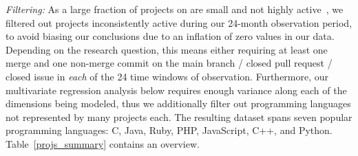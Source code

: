 \smallskip\noindent\emph{Filtering:}
As a large fraction of projects on \GH are small and not highly 
active~\cite{gousios2014exploratory}, we filtered out projects inconsistently 
active during our 24-month observation period, to avoid biasing our 
conclusions due to an inflation of zero values in our data.
Depending on the research question, this means either requiring at least 
one merge and one non-merge commit on the main branch / closed pull
request / closed issue in \emph{each} of the 24 time windows of observation.
Furthermore, our multivariate regression analysis below requires enough 
variance along each of the dimensions being modeled, thus we additionally
filter out programming languages not represented by many projects each.
The resulting dataset spans seven popular programming languages: 
C, Java, Ruby, PHP, JavaScript, C++, and Python.
Table~\ref{projs_summary} contains an overview.




%

%



